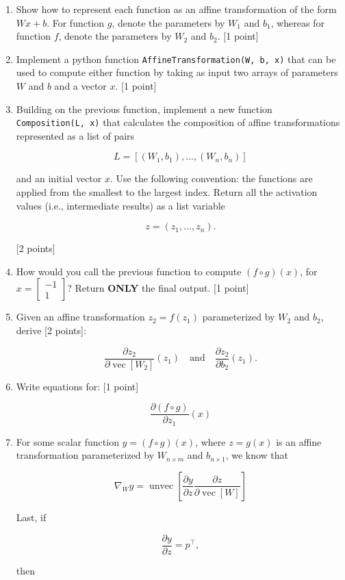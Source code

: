 \documentclass[
  letterpaper,
  DIV=11,
  numbers=noendperiod]{scrartcl}
\begin{document}
\begin{enumerate}
\def\labelenumi{\arabic{enumi}.}
\item
  Show how to represent each function as an affine transformation of the
  form \(Wx + b\). For function \(g\), denote the parameters by \(W_1\)
  and \(b_1\), whereas for function \(f\), denote the parameters by
  \(W_2\) and \(b_2\). {[}1 point{]}
\item
  Implement a python function \texttt{AffineTransformation(W,\ b,\ x)}
  that can be used to compute either function by taking as input two
  arrays of parameters \(W\) and \(b\) and a vector \(x\). {[}1 point{]}
\item
  Building on the previous function, implement a new function
  \texttt{Composition(L,\ x)} that calculates the composition of affine
  transformations represented as a list of pairs

  \[
  L = [(W_1, b_1), \ldots, (W_n, b_n)]
  \]

  and an initial vector \(x\). Use the following convention: the
  functions are applied from the smallest to the largest index. Return
  all the activation values (i.e., intermediate results) as a list
  variable

  \[
  z = (z_1, \ldots, z_n).
  \]

  {[}2 points{]}
\item
  How would you call the previous function to compute
  \((f \circ g)(x)\), for \(x = \begin{bmatrix} -1 \\ 1 \end{bmatrix}\)?
  Return \textbf{ONLY} the final output. {[}1 point{]}
\item
  Given an affine transformation \(z_2 = f(z_1)\) parameterized by
  \(W_2\) and \(b_2\), derive {[}2 points{]}:

  \[
  \frac{\partial z_2}{\partial \operatorname{vec}[W_2]}(z_1) \quad \text{and} \quad \frac{\partial z_2}{\partial b_2}(z_1).
  \]
\item
  Write equations for: {[}1 point{]}

  \[
  \frac{\partial (f \circ g)}{\partial z_1}(x)
  \]
\item
  For some scalar function \(y = (f \circ g)(x)\), where \(z = g(x)\) is
  an affine transformation parameterized by \(W_{n \times m}\) and
  \(b_{n \times 1}\), we know that

  \[
  \nabla_W y = \operatorname{unvec}\left[\frac{\partial y}{\partial z} \frac{\partial z}{\partial \operatorname{vec}[W]}\right]
  \]

  Last, if

  \[
  \frac{\partial y}{\partial z} = p^\top,
  \]

  then
\end{enumerate}
\end{document}
